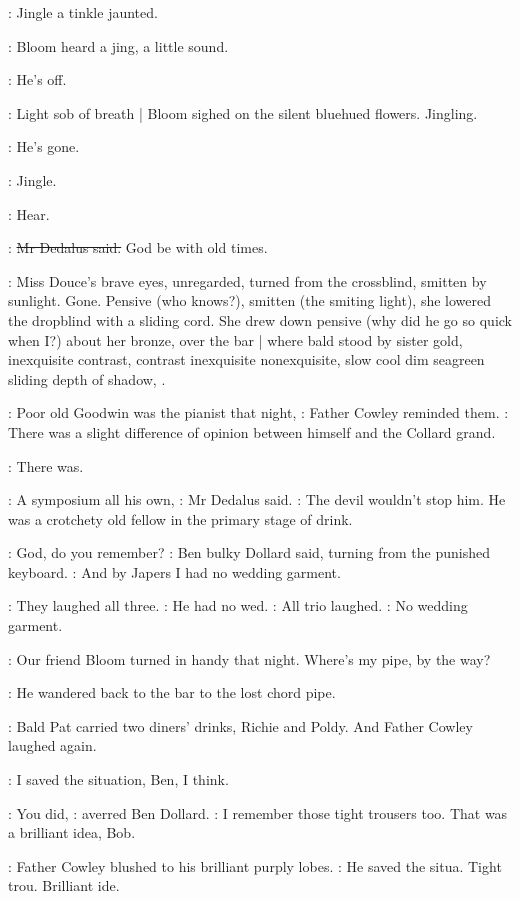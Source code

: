:
Jingle a tinkle jaunted.

:
Bloom heard a jing,
a little sound.

\BloomInt:
He's off.

:
Light sob of breath |
Bloom sighed on the silent bluehued flowers.
Jingling.

\BloomInt:
He's gone.

:
Jingle.

\BloomInt:
Hear.

\simon:
\sout{Mr Dedalus said.}
God be with old times.

:
Miss Douce's brave eyes,
unregarded,
turned from the crossblind,
smitten by sunlight.
Gone.
Pensive (who knows?),
smitten (the smiting light),
she lowered the dropblind with a sliding cord.
She drew down pensive
(why did he go so quick when I?)
about her bronze,
over the bar |
where bald stood by sister gold,
inexquisite contrast,
contrast inexquisite nonexquisite,
slow cool dim seagreen sliding depth of shadow,
.

\cowley:
Poor old Goodwin was the pianist that night,
:
Father Cowley reminded them.
\cowley:
There was a slight difference of opinion between himself and the
Collard grand.

:
There was.

\simon:
A symposium all his own,
:
Mr Dedalus said.
\simon:
The devil wouldn't stop him.
He was a crotchety old fellow in the primary stage of drink.

\dollard:
God,
do you remember?
:
Ben bulky Dollard said,
turning from the punished keyboard.
\dollard:
And by Japers I had no wedding garment.

:
They laughed all three.
\simon:
He had no wed.
:
All trio laughed.
\dollard:
No wedding garment.

\simon:
Our friend Bloom turned in handy that night.
Where's
my pipe,
by the way?

:
He wandered back to the bar to the lost chord pipe.

:
Bald Pat carried
two diners' drinks,
Richie and Poldy.
And Father Cowley laughed again.

\cowley:
I saved the situation,
Ben,
I think.

\dollard:
You did,
:
averred Ben Dollard.
\dollard:
I remember those tight trousers too.
That was a brilliant idea,
Bob.

:
Father Cowley blushed to his brilliant purply lobes.
\cowley:
He saved the
situa.
Tight trou.
Brilliant ide.

